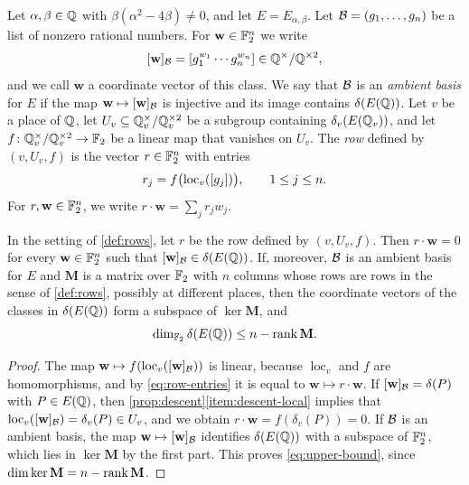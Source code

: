 \begin{definition}\label{def:rows}
Let $\alpha,\beta\in\mathbb Q$ with $\beta(\alpha^2-4\beta)\ne0$, and let $E=E_{\alpha,\beta}$. Let $\mathcal B=(g_1,\dots,g_n)$ be a list of nonzero rational numbers. For $\mathbf w\in\mathbb F_2^n$ we write
\begin{equation}\label{eq:coordinates}
[\mathbf w]_{\mathcal B}=[g_1^{w_1}\cdots g_n^{w_n}]\in\mathbb Q^{\times}/\mathbb Q^{\times2},
\end{equation}
and we call $\mathbf w$ a coordinate vector of this class. We say that $\mathcal B$ is an \emph{ambient basis} for $E$ if the map $\mathbf w\mapsto[\mathbf w]_{\mathcal B}$ is injective and its image contains $\delta(E(\mathbb Q))$. Let $v$ be a place of $\mathbb Q$, let $U_v\subseteq\mathbb Q_v^{\times}/\mathbb Q_v^{\times2}$ be a subgroup containing $\delta_v(E(\mathbb Q_v))$, and let $f\colon\mathbb Q_v^{\times}/\mathbb Q_v^{\times2}\to\mathbb F_2$ be a linear map that vanishes on $U_v$. The \emph{row} defined by $(v,U_v,f)$ is the vector $r\in\mathbb F_2^n$ with entries
\begin{equation}\label{eq:row-entries}
r_j=f\bigl(\operatorname{loc}_v([g_j])\bigr),\qquad1\le j\le n.
\end{equation}
For $r,\mathbf w\in\mathbb F_2^n$, we write $r\cdot\mathbf w=\sum_jr_jw_j$.
\end{definition}

\begin{lemma}\label{lem:upper-bound}
In the setting of \cref{def:rows}, let $r$ be the row defined by $(v,U_v,f)$. Then $r\cdot\mathbf w=0$ for every $\mathbf w\in\mathbb F_2^n$ such that $[\mathbf w]_{\mathcal B}\in\delta(E(\mathbb Q))$. If, moreover, $\mathcal B$ is an ambient basis for $E$ and $\mathbf M$ is a matrix over $\mathbb F_2$ with $n$ columns whose rows are rows in the sense of \cref{def:rows}, possibly at different places, then the coordinate vectors of the classes in $\delta(E(\mathbb Q))$ form a subspace of $\ker\mathbf M$, and
\begin{equation}\label{eq:upper-bound}
\dim_{\mathbb F_2}\delta(E(\mathbb Q))\le n-\operatorname{rank}\mathbf M.
\end{equation}
\end{lemma}

\begin{proof}
The map $\mathbf w\mapsto f(\operatorname{loc}_v([\mathbf w]_{\mathcal B}))$ is linear, because $\operatorname{loc}_v$ and $f$ are homomorphisms, and by \eqref{eq:row-entries} it is equal to $\mathbf w\mapsto r\cdot\mathbf w$. If $[\mathbf w]_{\mathcal B}=\delta(P)$ with $P\in E(\mathbb Q)$, then \cref{prop:descent}\ref{item:descent-local} implies that $\operatorname{loc}_v([\mathbf w]_{\mathcal B})=\delta_v(P)\in U_v$, and we obtain $r\cdot\mathbf w=f(\delta_v(P))=0$. If $\mathcal B$ is an ambient basis, the map $\mathbf w\mapsto[\mathbf w]_{\mathcal B}$ identifies $\delta(E(\mathbb Q))$ with a subspace of $\mathbb F_2^n$, which lies in $\ker\mathbf M$ by the first part. This proves \eqref{eq:upper-bound}, since $\dim\ker\mathbf M=n-\operatorname{rank}\mathbf M$.
\end{proof}

